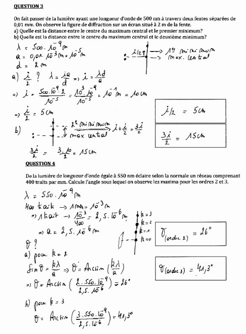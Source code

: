 \includegraphics[width=18.503cm,height=25.456cm]{Pictures/100000010000025F00000343A168F15A1FB3D46F.png}

